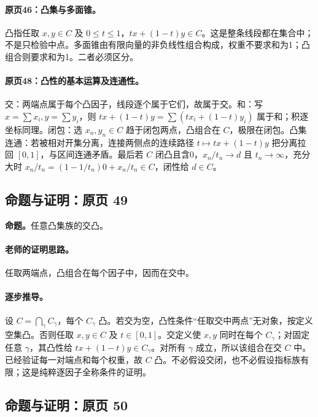 \paragraph{原页46：凸集与多面锥。}凸指任取 $x,y\in C$ 及 $0\le t\le1$，$tx+(1-t)y\in C$。这是整条线段都在集合中；不是只检验中点。多面锥由有限向量的非负线性组合构成，权重不要求和为1；凸组合则要求和为1。二者必须区分。



\paragraph{原页48：凸性的基本运算及连通性。}交：两端点属于每个凸因子，线段逐个属于它们，故属于交。和：写 $x=\sum x_i,y=\sum y_i$，则 $tx+(1-t)y=\sum(tx_i+(1-t)y_i)$ 属于和；积逐坐标同理。闭包：选 $x_n,y_n\in C$ 趋于闭包两点，凸组合在 $C$，极限在闭包。凸集连通：若被相对开集分离，连接两侧点的连续路径 $t\mapsto tx+(1-t)y$ 把分离拉回 $[0,1]$，与区间连通矛盾。最后若 $C$ 闭凸且含0，$x_n/t_n\to d$ 且 $t_n\to\infty$，充分大时 $x_n/t_n=(1-1/t_n)0+x_n/t_n\in C$，闭性给 $d\in C$。



\subsection{命题与证明：原页 49}

\textbf{命题。}任意凸集族的交凸。

\paragraph{老师的证明思路。}任取两端点，凸组合在每个因子中，因而在交中。

\paragraph{逐步推导。}
设 $C=\bigcap_\gamma C_\gamma$，每个 $C_\gamma$ 凸。若交为空，凸性条件“任取交中两点”无对象，按定义空集凸。否则任取 $x,y\in C$ 及 $t\in[0,1]$。交定义使 $x,y$ 同时在每个 $C_\gamma$；对固定任意 $\gamma$，其凸性给 $tx+(1-t)y\in C_\gamma$。对所有 $\gamma$ 成立，所以该组合在交 $C$ 中。
已经验证每一对端点和每个权重，故 $C$ 凸。不必假设交闭，也不必假设指标族有限；这是纯粹逐因子全称条件的证明。


\subsection{命题与证明：原页 50}

